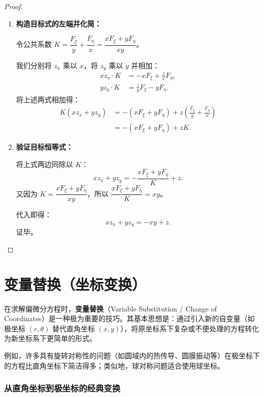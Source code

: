 \documentclass[lang=cn,11pt]{elegantbook}
\begin{document}
\begin{proof}
\begin{enumerate}
  \item \textbf{构造目标式的左端并化简：}
  
  令公共系数 $K = \dfrac{F_\xi}{y} + \dfrac{F_\eta}{x} = \dfrac{x F_\xi + y F_\eta}{xy}$。
  
  我们分别将 $z_x$ 乘以 $x$，将 $z_y$ 乘以 $y$ 并相加：
  \begin{align*}
  x z_x \cdot K &= -x F_\xi + \frac{z}{x}F_\eta, \\[6pt]
  y z_y \cdot K &= \frac{z}{y}F_\xi - y F_\eta.
  \end{align*}
  将上述两式相加得：
  \begin{align*}
  K \left(x z_x + y z_y\right) &= -(x F_\xi + y F_\eta) + z\left(\frac{F_\xi}{y} + \frac{F_\eta}{x}\right) \\[6pt]
  &= -(x F_\xi + y F_\eta) + z K.
  \end{align*}

  \item \textbf{验证目标恒等式：}
  
  将上式两边同除以 $K$：
  \[
  x z_x + y z_y = -\frac{x F_\xi + y F_\eta}{K} + z.
  \]
  又因为 $K = \dfrac{x F_\xi + y F_\eta}{xy}$，所以 $\dfrac{x F_\xi + y F_\eta}{K} = xy$。
  
  代入即得：
  \[
  x z_x + y z_y = -xy + z.
  \]
  证毕。
\end{enumerate}
\end{proof}

\section{变量替换（坐标变换）}

在求解偏微分方程时，\textbf{变量替换}（Variable Substitution / Change of Coordinates）是一种极为重要的技巧。其基本思想是：通过引入新的自变量（如极坐标 $(r,\theta)$ 替代直角坐标 $(x,y)$），将原坐标系下复杂或不便处理的方程转化为新坐标系下更简单的形式。

例如，许多具有旋转对称性的问题（如圆域内的热传导、圆膜振动等）在极坐标下的方程比直角坐标下简洁得多；类似地，球对称问题适合使用球坐标。

\subsubsection*{从直角坐标到极坐标的经典变换}
\end{document}
